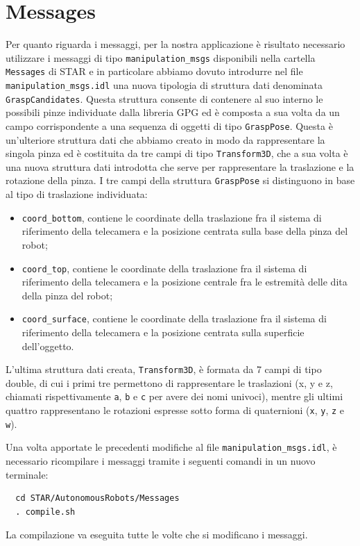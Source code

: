 \documentclass{report}
\begin{document}
\section{Messages}\label{messages}
Per quanto riguarda i messaggi, per la nostra applicazione è risultato necessario utilizzare i messaggi di tipo \texttt{manipulation\_msgs} disponibili nella cartella \texttt{Messages} di STAR e in particolare abbiamo dovuto introdurre nel file \texttt{manipulation\_msgs.idl} una nuova tipologia di struttura dati denominata \texttt{GraspCandidates}. Questa struttura consente di contenere al suo interno le possibili pinze individuate dalla libreria GPG ed è composta a sua volta da un campo corrispondente a una sequenza di oggetti di tipo \texttt{GraspPose}. Questa è un'ulteriore struttura dati che abbiamo creato in modo da rappresentare la singola pinza ed è costituita da tre campi di tipo \texttt{Transform3D}, che a sua volta è una nuova struttura dati introdotta che serve per rappresentare la traslazione e la rotazione della pinza. I tre campi della struttura \texttt{GraspPose} si distinguono in base al tipo di traslazione individuata:
\begin{itemize}
	\item \texttt{coord\_bottom}, contiene le coordinate della traslazione fra il sistema di riferimento della telecamera e la posizione centrata sulla base della pinza del robot;
	\item \texttt{coord\_top}, contiene le coordinate della traslazione fra il sistema di riferimento della telecamera e la posizione centrale fra le estremità delle dita della pinza del robot;
	\item \texttt{coord\_surface}, contiene le coordinate della traslazione fra il sistema di riferimento della telecamera e la posizione centrata sulla superficie dell'oggetto.
\end{itemize}
L'ultima struttura dati creata, \texttt{Transform3D}, è formata da 7 campi di tipo double, di cui i primi tre permettono di rappresentare le traslazioni (x, y e z, chiamati rispettivamente \texttt{a}, \texttt{b} e \texttt{c} per avere dei nomi univoci), mentre gli ultimi quattro rappresentano le rotazioni espresse sotto forma di quaternioni (\texttt{x}, \texttt{y}, \texttt{z} e \texttt{w}). \par
Una volta apportate le precedenti modifiche al file \texttt{manipulation\_msgs.idl}, è necessario ricompilare i messaggi tramite i seguenti comandi in un nuovo terminale: 
\begin{verbatim}
  cd STAR/AutonomousRobots/Messages
  . compile.sh
\end{verbatim}
La compilazione va eseguita tutte le volte che si modificano i messaggi.
\end{document}
